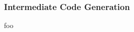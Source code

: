 
\subsubsection{Intermediate Code Generation}
\label{sec:lit_review_intermediate_code_generation}



foo
